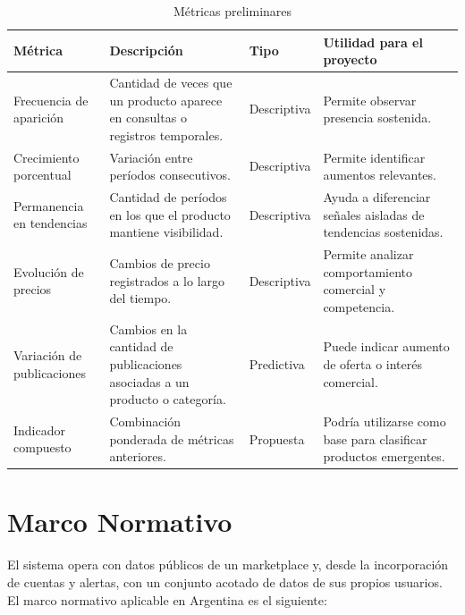 \begin{table}[H]
	\centering
	\caption{Métricas preliminares}
	\label{tab:metricas}
	\begin{tabularx}{\textwidth}{@{}>{\raggedright\arraybackslash}p{3cm} >{\raggedright\arraybackslash}p{4cm} p{1.8cm} X@{}}
		\toprule
		\textbf{Métrica} & \textbf{Descripción} & \textbf{Tipo} & \textbf{Utilidad para el proyecto} \\
		\midrule
		Frecuencia de aparición & Cantidad de veces que un producto aparece en consultas o registros temporales. & Descriptiva & Permite observar presencia sostenida. \\
		Crecimiento porcentual & Variación entre períodos consecutivos. & Descriptiva & Permite identificar aumentos relevantes. \\
		Permanencia en tendencias & Cantidad de períodos en los que el producto mantiene visibilidad. & Descriptiva & Ayuda a diferenciar señales aisladas de tendencias sostenidas. \\
		Evolución de precios & Cambios de precio registrados a lo largo del tiempo. & Descriptiva & Permite analizar comportamiento comercial y competencia. \\
		Variación de publicaciones & Cambios en la cantidad de publicaciones asociadas a un producto o categoría. & Predictiva & Puede indicar aumento de oferta o interés comercial. \\
		Indicador compuesto & Combinación ponderada de métricas anteriores. & Propuesta & Podría utilizarse como base para clasificar productos emergentes. \\
		\bottomrule
	\end{tabularx}
\end{table}

\section{Marco Normativo}\label{sec:marco-normativo}

El sistema opera con datos públicos de un marketplace y, desde la incorporación de cuentas y alertas, con un conjunto acotado de datos de sus propios usuarios. El marco normativo aplicable en Argentina es el siguiente:

